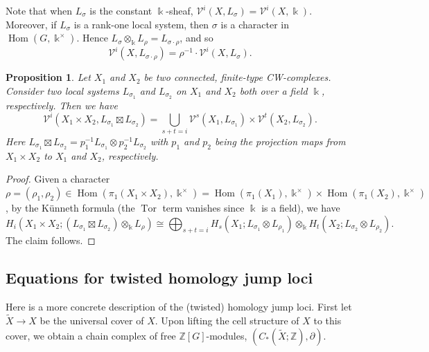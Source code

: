 \documentclass[11pt]{amsart}
\newtheorem{proposition}[theorem]{Proposition}
\theoremstyle{definition}
\newcommand{\Z}{\mathbb{Z}}
\renewcommand{\k}{\Bbbk}
\newcommand{\VV}{\mathcal{V}}
\DeclareMathOperator{\Hom}{{Hom}}
\DeclareMathOperator{\Tor}{{Tor}}
\begin{document}
Note that when $L_\sigma$ is the constant $\k$-sheaf, 
$\VV^i(X,L_\sigma)=\VV^i(X,\k)$. 
Moreover, if $L_\sigma$ is a rank-one local system, then  
$\sigma$ is a character in $\Hom(G,\k^{\times})$. Hence 
$L_\sigma\otimes_{\k} L_{\rho}=L_{\sigma\cdot \rho}$, and so   
\begin{equation}
\label{eq:rho-vv}
\VV^i(X,L_{\sigma\cdot \rho})=\rho^{-1} \cdot \VV^i(X,L_\sigma) .
\end{equation}

\begin{proposition}
\label{prop:product-formula}
 Let $X_1$ and $X_2$ be two connected, finite-type CW-complexes. 
 Consider two local systems $L_{\sigma_1}$ and $L_{\sigma_2}$ on $X_1$ 
 and $X_2$ both over a field $\k$, respectively.  Then we have
\[
\VV^i(X_1 \times X_2, L_{\sigma_1} \boxtimes L_{\sigma_2})= 
\bigcup_{s+t=i} \VV^s(X_1, L_{\sigma_1}) \times \VV^t(X_2, L_{\sigma_2}) .
\]
Here $L_{\sigma_1} \boxtimes L_{\sigma_2} = p_1^{-1}L_{\sigma_1} 
\otimes p_2^{-1}L_{\sigma_2}$ with $p_1$ and $p_2$ being the projection 
maps from $X_1\times X_2$ to $X_1$ and $X_2$, respectively.  
\end{proposition}

\begin{proof}
Given a character $\rho = (\rho_1,\rho_2) \in \Hom(\pi_1(X_1\times X_2),\k^\times)=
\Hom(\pi_1(X_1),\k^\times)\times \Hom(\pi_1( X_2),\k^\times) $, by the K\"unneth formula 
(the $\Tor$ term vanishes since $\k$ is a field), we have 
\[
H_i(X_1\times X_2; (L_{\sigma_1} \boxtimes L_{\sigma_2})\otimes_{\k} 
L_\rho) \cong \bigoplus_{s+t=i} H_s(X_1; L_{\sigma_1} \otimes L_{\rho_1})\otimes_\k  
H_t(X_2; L_{\sigma_2} \otimes L_{\rho_2}).
\]
The claim follows.
\end{proof}

\subsection{Equations for twisted homology jump loci} 
\label{subsec:twist-det}
Here is a more concrete description of the (twisted) homology jump loci. 
First let $\widetilde{X}\to X$ be the universal cover of $X$. Upon lifting 
the cell structure of $X$ to this cover, we obtain a chain complex of free 
$\Z[G]$-modules, $(C_{*}(\widetilde{X};\Z), \partial)$.
\end{document}
